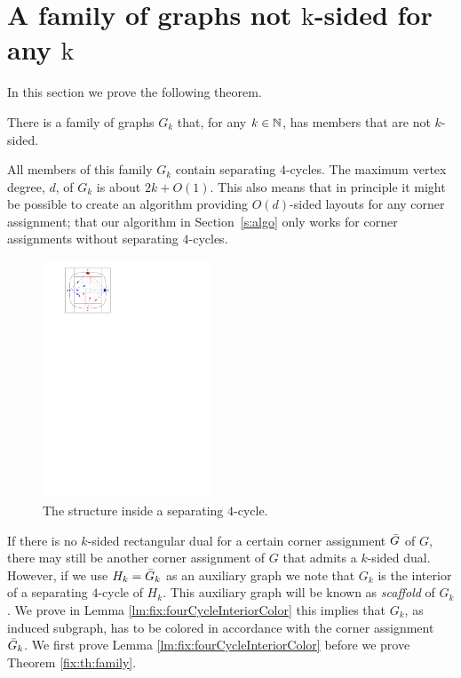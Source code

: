 
\section{A family of graphs not $\mathrm{k}$-sided for any $\mathrm{k}$}
\thispagestyle{plain}
  \label{s:fix}
  In this section we prove the following theorem.

  \begin{thrm}
    \label{fix:th:family}
      There is a family of graphs $G_k$ that, for any $k \in \mathbb{N}$, has members that are not $k$-sided.
  \end{thrm}

  All members of this family $G_k$ contain separating $4$-cycles.
  The maximum vertex degree, $d$, of $G_k$ is about $2k+O(1)$. This also means that in principle it might be possible to create an algorithm providing $O(d)$-sided layouts for any corner assignment; that our algorithm in Section~\ref{s:algo} only works for corner assignments without separating $4$-cycles.

  \begin{figure}
    \centering
    \includegraphics[width=5cm]{fixExtension/img/sep4cycle.pdf}
    \caption{The structure inside a separating $4$-cycle.}
    \label{fig:fix:sep4cycle}
  \end{figure}

  If there is no $k$-sided rectangular dual for a certain corner assignment $\bar{G}$ of $G$, there may still be another corner assignment of $G$ that admits a $k$-sided dual.
  However, if we use $ H_k = \bar{G}_k$ as an auxiliary graph we note that $G_k$ is the interior of a separating $4$-cycle of $H_k$. This auxiliary graph will be known as \emph{scaffold} of $G_k$.
  We prove in Lemma \ref{lm:fix:fourCycleInteriorColor} this implies that $G_k$, as induced subgraph, has to be colored in accordance with the corner assignment $\bar{G}_k$.
  We first prove Lemma \ref{lm:fix:fourCycleInteriorColor} before we prove Theorem \ref{fix:th:family}.

